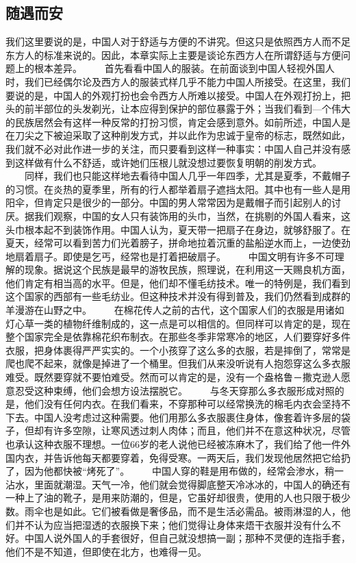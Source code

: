 \documentclass[12pt,oneside]{book}
\begin{document}
\begin{common-format}
\chapter{随遇而安}
我们这里要说的是，中国人对于舒适与方便的不讲究。但这只是依照西方人而不足东方人的标准来说的。因此，本章实际上主要是谈论东西方人在所谓舒适与方便问题上的根本差异。 
　　首先看看中国人的服装。在前面谈到中国人轻视外国人时，我们已经偶尔论及西方人的服装式样几乎不能力中国人所接受。在这里，我们要说的是，中国人的外观打扮也会令西方人所难以接受。中国人在外观打扮上，把头的前半部位的头发剃光，让本应得到保护的部位暴露于外；当我们看到—个伟大的民族居然会有这样一种反常的打扮习惯，肯定会感到意外。如前所述，中国人是在刀尖之下被迫采取了这种削发方式，并以此作为忠诚于皇帝的标志，既然如此，我们就不必对此作进一步的关注，而只要看到这样一种事实：中国人自己并没有感到这样做有什么不舒适，或许她们压根儿就没想过要恢复明朝的削发方式。 
　　同样，我们也只能这样地去看待中国人几乎一年四季，尤其是夏季，不戴帽子的习惯。在炎热的夏季里，所有的行人都举着扇子遮挡太阳。其中也有一些人是用阳伞，但肯定只是很少的一部分。中国的男人常常因为是戴帽子而引起别人的讨厌。据我们观察，中国的女人只有装饰用的头巾，当然，在挑剔的外国人看来，这头巾根本起不到装饰作用。中国人认为，夏天带一把扇子在身边，就够舒服了。在夏天，经常可以看到苦力们光着膀子，拼命地拉着沉重的盐船逆水而上，一边使劲地扇着扇子。即使是乞丐，经常也是打着把破扇子。 
　　中国文明有许多不可理解的现象。据说这个民族是最早的游牧民族，照理说，在利用这一天赐良机方面，他们肯定有相当高的水平。但是，他们却不懂毛纺技术。唯一的特例是，我们看到这个国家的西部有一些毛纺业。但这种技术并没有得到普及，我们仍然看到成群的羊漫游在山野之中。 
　　在棉花传人之前的古代，这个国家人们的衣服是用诸如灯心草一类的植物纤维制成的，这一点是可以相信的。但同样可以肯定的是，现在整个国家完全是依靠棉花织布制衣。在那些冬季非常寒冷的地区，人们要穿好多件衣服，把身体裹得严严实实的。一个小孩穿了这么多的衣服，若是摔倒了，常常是爬也爬不起来，就像是掉进了一个桶里。但我们从来没听说有人抱怨穿这么多衣服难受。既然要穿就不要怕难受。然而可以肯定的是，没有一个盎格鲁－撒克逊人愿意忍受这种束缚，他们会想方设法摆脱它。 
　　与冬天穿那么多衣服形成对照的是，他们没有任何内衣。在我们看来，不穿那种可以经常换洗的棉毛内衣会坚持不下去。中国人没考虑过这种需要。他们用那么多衣服裹住身体，像套着许多层的袋子，但却有许多空隙，让寒风透过刺人肉体；而且，他们并不在意这种状况，尽管也承认这种衣服不理想。一位66岁的老人说他已经被冻麻木了，我们给了他一件外国内衣，并告诉他每天都要穿着，免得受寒。一两天后，我们发现他居然把它给扔了，因为他都快被“烤死了”。 
　　中国人穿的鞋是用布做的，经常会渗水，稍一沾水，里面就潮湿。天气一冷，他们就会觉得脚底整天冷冰冰的，中国人的确还有一种上了油的靴子，是用来防潮的，但是，它虽好却很贵，使用的人也只限于极少数。雨伞也是如此。它们被看做是奢侈品，而不是生活必需品。被雨淋湿的人，他们并不认为应当把湿透的衣服换下来；他们觉得让身体来焐干衣服并没有什么不好。中国人说外国人的手套很好，但自己就没想搞一副；那种不灵便的连指手套，他们不是不知道，但即使在北方，也难得一见。 

\end{common-format}
\end{document}

